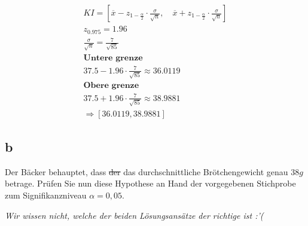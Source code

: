 \begin{align*}
    KI = \left[\overline{x} - z_{1 - \frac{\alpha}{2}} \cdot \frac{\sigma}{\sqrt{n}}, \quad \overline{x} + z_{1 - \frac{\alpha}{2}} \cdot \frac{\sigma}{\sqrt{n}}\right] \\
    z_{0.975} = 1.96                                                                                                                                                     \\
    \frac{\sigma}{\sqrt{n}} = \frac{7}{\sqrt{85}}                                                                                                                        \\
    \textbf{Untere grenze}                                                                                                                                               \\
    37.5 - 1.96 \cdot \frac{7}{\sqrt{85}} \approx 36.0119                                                                                                                \\
    \textbf{Obere grenze}                                                                                                                                                \\
    37.5 + 1.96 \cdot \frac{7}{\sqrt{85}} \approx 38.9881                                                                                                                \\
    \Rightarrow [36.0119, 38.9881]
\end{align*}

\subsection{b}

Der Bäcker behauptet, dass \sout{der} das durchschnittliche Brötchengewicht
genau $38g$ betrage. Prüfen Sie nun diese Hypothese an Hand der vorgegebenen
Stichprobe zum Signifikanzniveau $\alpha = 0,05$.

\textit{Wir wissen nicht, welche der beiden Lösungsansätze der richtige ist :'(}

